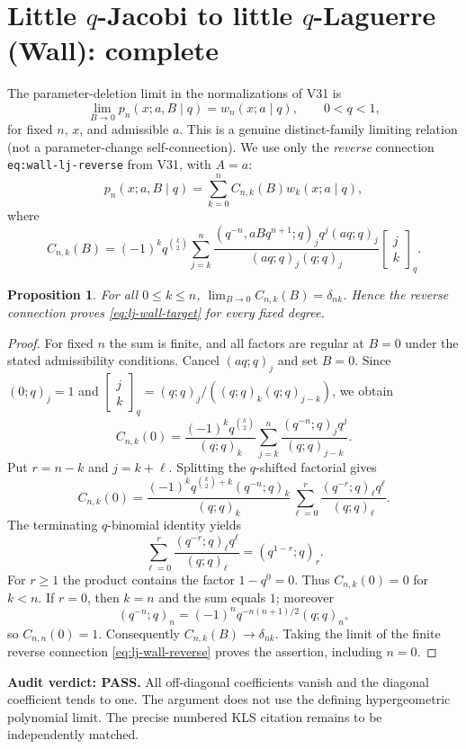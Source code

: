 \documentclass[11pt]{article}
\newtheorem{proposition}{Proposition}
\begin{document}
\section{Little $q$-Jacobi to little $q$-Laguerre (Wall): complete}
The parameter-deletion limit in the normalizations of V31 is
\begin{equation}\label{eq:lj-wall-target}
\lim_{B\to0}p_n(x;a,B\mid q)=w_n(x;a\mid q),\qquad 0<q<1,
\end{equation}
for fixed $n$, $x$, and admissible $a$. This is a genuine distinct-family limiting relation (not a parameter-change self-connection). We use only the \emph{reverse} connection \texttt{eq:wall-lj-reverse} from V31, with $A=a$:
\begin{equation}\label{eq:lj-wall-reverse}
 p_n(x;a,B\mid q)=\sum_{k=0}^n C_{n,k}(B)w_k(x;a\mid q),
\end{equation}
where
\[
 C_{n,k}(B)=(-1)^kq^{\binom{k}{2}}
 \sum_{j=k}^n
 \frac{(q^{-n},aBq^{n+1};q)_j q^j(aq;q)_j}
 {(aq;q)_j(q;q)_j}
 \begin{bmatrix}j\\k\end{bmatrix}_q.
\]
\begin{proposition}
For all $0\le k\le n$, $\lim_{B\to0}C_{n,k}(B)=\delta_{nk}$. Hence the reverse connection proves \eqref{eq:lj-wall-target} for every fixed degree.
\end{proposition}
\begin{proof}
For fixed $n$ the sum is finite, and all factors are regular at $B=0$ under the stated admissibility conditions. Cancel $(aq;q)_j$ and set $B=0$. Since $(0;q)_j=1$ and
$\begin{bmatrix}j\\k\end{bmatrix}_q=(q;q)_j/((q;q)_k(q;q)_{j-k})$, we obtain
\[
 C_{n,k}(0)=\frac{(-1)^kq^{\binom{k}{2}}}{(q;q)_k}
 \sum_{j=k}^n\frac{(q^{-n};q)_j q^j}{(q;q)_{j-k}}.
\]
Put $r=n-k$ and $j=k+\ell$. Splitting the $q$-shifted factorial gives
\[
 C_{n,k}(0)=\frac{(-1)^kq^{\binom{k}{2}+k}(q^{-n};q)_k}{(q;q)_k}
 \sum_{\ell=0}^{r}\frac{(q^{-r};q)_\ell q^\ell}{(q;q)_\ell}.
\]
The terminating $q$-binomial identity yields
\[
 \sum_{\ell=0}^{r}\frac{(q^{-r};q)_\ell q^\ell}{(q;q)_\ell}
 =(q^{1-r};q)_r.
\]
For $r\ge1$ the product contains the factor $1-q^0=0$. Thus $C_{n,k}(0)=0$ for $k<n$. If $r=0$, then $k=n$ and the sum equals $1$; moreover
\[
 (q^{-n};q)_n=(-1)^nq^{-n(n+1)/2}(q;q)_n,
\]
so $C_{n,n}(0)=1$. Consequently $C_{n,k}(B)\to\delta_{nk}$. Taking the limit of the finite reverse connection \eqref{eq:lj-wall-reverse} proves the assertion, including $n=0$.
\end{proof}
\noindent\textbf{Audit verdict: PASS.} All off-diagonal coefficients vanish and the diagonal coefficient tends to one. The argument does not use the defining hypergeometric polynomial limit. The precise numbered KLS citation remains to be independently matched.
\end{document}
